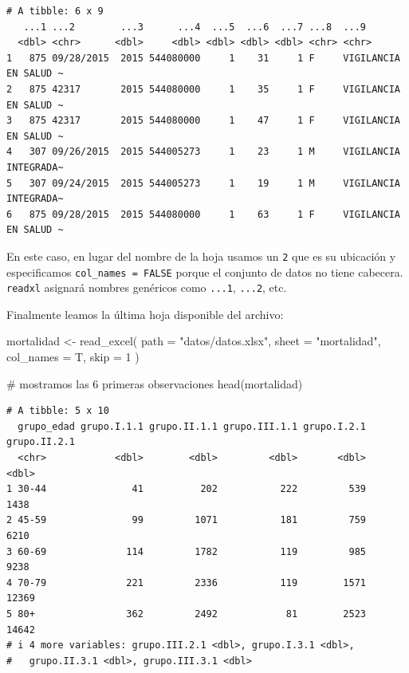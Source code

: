\documentclass[
  spanish,
  a4paper,
]{scrbook}
\newenvironment{Shaded}{\begin{snugshade}}{\end{snugshade}}
\newcommand{\AttributeTok}[1]{\textcolor[rgb]{0.40,0.45,0.13}{#1}}
\newcommand{\CommentTok}[1]{\textcolor[rgb]{0.37,0.37,0.37}{#1}}
\newcommand{\DecValTok}[1]{\textcolor[rgb]{0.68,0.00,0.00}{#1}}
\newcommand{\FunctionTok}[1]{\textcolor[rgb]{0.28,0.35,0.67}{#1}}
\newcommand{\NormalTok}[1]{\textcolor[rgb]{0.00,0.23,0.31}{#1}}
\newcommand{\OtherTok}[1]{\textcolor[rgb]{0.00,0.23,0.31}{#1}}
\newcommand{\StringTok}[1]{\textcolor[rgb]{0.13,0.47,0.30}{#1}}
\begin{document}
\begin{verbatim}
# A tibble: 6 x 9
   ...1 ...2        ...3      ...4  ...5  ...6  ...7 ...8  ...9                 
  <dbl> <chr>      <dbl>     <dbl> <dbl> <dbl> <dbl> <chr> <chr>                
1   875 09/28/2015  2015 544080000     1    31     1 F     VIGILANCIA EN SALUD ~
2   875 42317       2015 544080000     1    35     1 F     VIGILANCIA EN SALUD ~
3   875 42317       2015 544080000     1    47     1 F     VIGILANCIA EN SALUD ~
4   307 09/26/2015  2015 544005273     1    23     1 M     VIGILANCIA INTEGRADA~
5   307 09/24/2015  2015 544005273     1    19     1 M     VIGILANCIA INTEGRADA~
6   875 09/28/2015  2015 544080000     1    63     1 F     VIGILANCIA EN SALUD ~
\end{verbatim}

En este caso, en lugar del nombre de la hoja usamos un \texttt{2} que es
su ubicación y especificamos \texttt{col\_names\ =\ FALSE} porque el
conjunto de datos no tiene cabecera. \texttt{readxl} asignará nombres
genéricos como \texttt{...1}, \texttt{...2}, etc.

Finalmente leamos la última hoja disponible del archivo:

\begin{Shaded}
\begin{Highlighting}[]
\NormalTok{mortalidad }\OtherTok{\textless{}{-}} \FunctionTok{read\_excel}\NormalTok{(}
  \AttributeTok{path =} \StringTok{"datos/datos.xlsx"}\NormalTok{,}
  \AttributeTok{sheet =} \StringTok{"mortalidad"}\NormalTok{,}
  \AttributeTok{col\_names =}\NormalTok{ T,}
  \AttributeTok{skip =} \DecValTok{1}
\NormalTok{)}

\CommentTok{\# mostramos las 6 primeras observaciones}
\FunctionTok{head}\NormalTok{(mortalidad)}
\end{Highlighting}
\end{Shaded}

\begin{verbatim}
# A tibble: 5 x 10
  grupo_edad grupo.I.1.1 grupo.II.1.1 grupo.III.1.1 grupo.I.2.1 grupo.II.2.1
  <chr>            <dbl>        <dbl>         <dbl>       <dbl>        <dbl>
1 30-44               41          202           222         539         1438
2 45-59               99         1071           181         759         6210
3 60-69              114         1782           119         985         9238
4 70-79              221         2336           119        1571        12369
5 80+                362         2492            81        2523        14642
# i 4 more variables: grupo.III.2.1 <dbl>, grupo.I.3.1 <dbl>,
#   grupo.II.3.1 <dbl>, grupo.III.3.1 <dbl>
\end{verbatim}
\end{document}
